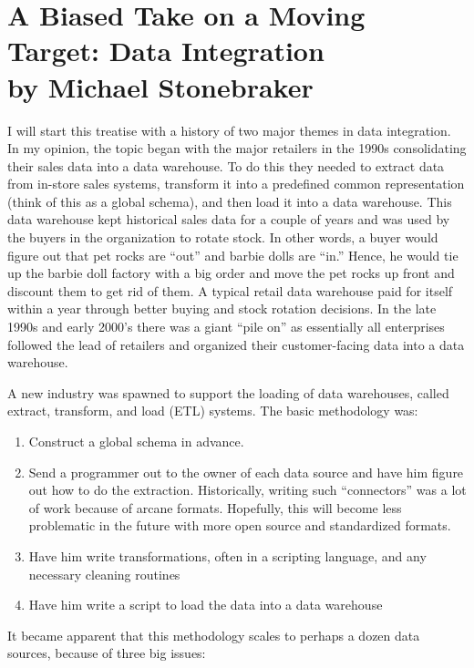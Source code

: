 \documentclass[b5paper,11pt,twoside,openright]{book}
\begin{document}
\hypertarget{ch12-dataintegration}{
  \chapter[Data Integration]{A Biased Take on a Moving Target: Data Integration\\{\Large by Michael Stonebraker}}\label{ch12-dataintegration}
}

I will start this treatise with a history of two major themes in data
integration. In my opinion, the topic began with the major retailers in
the 1990s consolidating their sales data into a data warehouse. To do
this they needed to extract data from in-store sales systems, transform
it into a predefined common representation (think of this as a global
schema), and then load it into a data warehouse. This data warehouse
kept historical sales data for a couple of years and was used by the
buyers in the organization to rotate stock. In other words, a buyer
would figure out that pet rocks are ``out'' and barbie dolls are ``in.''
Hence, he would tie up the barbie doll factory with a big order and move
the pet rocks up front and discount them to get rid of them. A typical
retail data warehouse paid for itself within a year through better
buying and stock rotation decisions. In the late 1990s and early 2000's
there was a giant ``pile on'' as essentially all enterprises followed
the lead of retailers and organized their customer-facing data into a
data warehouse.

A new industry was spawned to support the loading of data warehouses,
called extract, transform, and load (ETL) systems. The basic methodology
was:

\begin{enumerate}[label=\alph*)]
\item
Construct a global schema in advance.
\item
Send a programmer out to the owner of each data source and have him
figure out how to do the extraction. Historically, writing such
``connectors'' was a lot of work because of arcane formats. Hopefully,
this will become less problematic in the future with more open source
and standardized formats.
\item
Have him write transformations, often in a scripting language, and
any necessary cleaning routines
\item
Have him write a script to load the data into a data warehouse
\end{enumerate}

It became apparent that this methodology scales to perhaps a dozen data
sources, because of three big issues:
\end{document}
